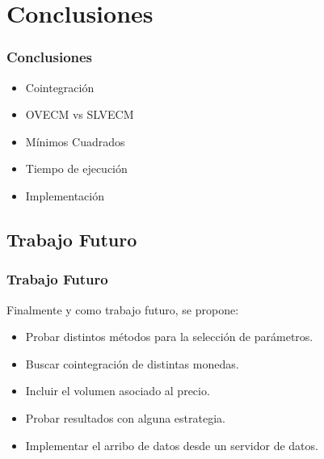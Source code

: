 \documentclass{beamer}
\begin{document}
    \section{Conclusiones}
            \begin{frame}
            \frametitle{Conclusiones}
            \begin{itemize}
            \item Cointegración
            \item OVECM vs SLVECM
            \item Mínimos Cuadrados
            \item Tiempo de ejecución
            \item Implementación
            \end{itemize}
            \end{frame}
        \subsection{Trabajo Futuro}
            \begin{frame}
            \frametitle{Trabajo Futuro}
            \newpage
            Finalmente y como trabajo futuro, se propone:
            \begin{itemize}
             \item Probar distintos métodos para la selección de parámetros. 
             \item Buscar cointegración de distintas monedas. 
             \item Incluir el volumen asociado al precio.
             \item Probar resultados con alguna estrategia. 
             \item Implementar el arribo de datos desde un servidor de datos. 
            \end{itemize}

            \end{frame}
\end{document}
